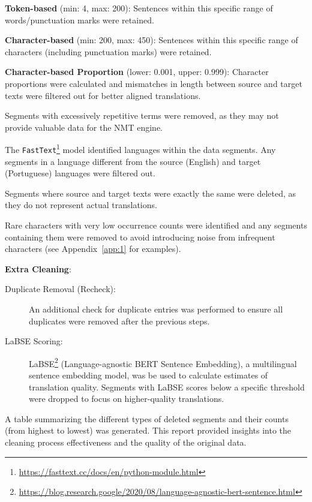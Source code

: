 \begin{description}
\begin{description}
\begin{description}
            \item \textbf{Token-based} (min: 4, max: 200): Sentences within this specific range of words/punctuation marks were retained.
            \item \textbf{Character-based} (min: 200, max: 450): Sentences within this specific range of characters (including punctuation marks) were retained.
            \item \textbf{Character-based Proportion} (lower: 0.001, upper: 0.999): Character proportions were calculated and mismatches in length between source and target texts were filtered out for better aligned translations.
        \end{description}
        \item[Repetition Removal:] Segments with excessively repetitive terms were removed, as they may not provide valuable data for the NMT engine.
        \item[Language Detection:] The \texttt{FastText}\footnote{\href{https://fasttext.cc/docs/en/python-module.html}{https://fasttext.cc/docs/en/python-module.html}} model identified languages within the data segments. Any segments in a language different from the source (English) and target (Portuguese) languages were filtered out.
        \item[Identical Text Removal:] Segments where source and target texts were exactly the same were deleted, as they do not represent actual translations.
        \item[Rare Characters Removal:] Rare characters with very low occurrence counts were identified and any segments containing them were removed to avoid introducing noise from infrequent characters (see Appendix~\ref{app:1} for examples).
        \end{description}
    \item \textbf{Extra Cleaning}:
    \begin{description}
        \item[Duplicate Removal (Recheck):] An additional check for duplicate entries was performed to ensure all duplicates were removed after the previous steps.
        \item[LaBSE Scoring:] LaBSE\footnote{\href{https://blog.research.google/2020/08/language-agnostic-bert-sentence.html}{https://blog.research.google/2020/08/language-agnostic-bert-sentence.html}} (Language-agnostic BERT Sentence Embedding), a multilingual sentence embedding model, was be used to calculate estimates of translation quality. Segments with LaBSE scores below a specific threshold were dropped to focus on higher-quality translations.
    \end{description}
    \item[Statistics Report:] A table summarizing the different types of deleted segments and their counts (from highest to lowest) was generated. This report provided insights into the cleaning process effectiveness and the quality of the original data.
\end{description}


